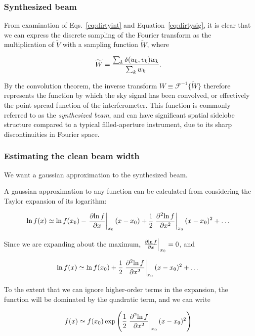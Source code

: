 \subsubsection{Synthesized beam}

From examination of Eqs.~\ref{eq:dirtyint} and
Equation~\ref{eq:dirtysig}, it is clear that we can express the
discrete sampling of the Fourier transform as the multiplication of
$\widetilde{V}$ with a sampling function $\widetilde{W}$, where

\begin{equation}
\widetilde{W} = {{\sum_k \delta(u_k, v_k) w_k}\over{\sum_k w_k}}.
\end{equation}

By the convolution theorem, the inverse transform $W \equiv
\mathcal{F}^{-1}\{\widetilde{W}\}$ therefore represents the function by which the sky
signal has been convolved, or effectively the point-spread function of
the interferometer.  This function is commonly referred to as the {\it
  synthesized beam}, and can have significant spatial sidelobe
structure compared to a typical filled-aperture instrument, due to its
sharp discontinuities in Fourier space.

\subsubsection{Estimating the clean beam width}

We want a gaussian approximation to the synthesized beam.  

A gaussian approximation to any function can be calculated from considering the Taylor expansion of its logarithm:

\begin{equation}
\ln f(x) \simeq \ln f(x_0) - \left.{\partial{\ln f}}\over{\partial{x}}\right|_{x_0}(x - x_0) + {1\over{2}}\left.{\partial^2{\ln f}}\over{\partial{x^2}}\right|_{x_0}(x - x_0)^2 + \dots
\end{equation}

Since we are expanding about the maximum, $\left.{{\partial{\ln f}}\over{\partial{x}}}\right|_{x_0} = 0$, and

\begin{equation}
\ln f(x) \simeq \ln f(x_0) + {1\over{2}}\left.{\partial^2{\ln f}}\over{\partial{x^2}}\right|_{x_0}(x - x_0)^2 + \dots
\end{equation}

To the extent that we can ignore higher-order terms in the expansion,
the function will be dominated by the quadratic term, and we can write

\begin{equation}
f(x) \simeq f(x_0) \exp\left({1\over{2}}\left.{\partial^2{\ln f}}\over{\partial{x^2}}\right|_{x_0}(x - x_0)^2\right)
\end{equation}

